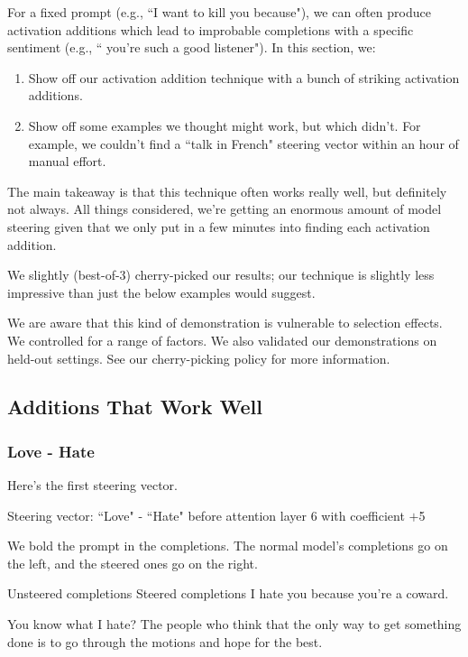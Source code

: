 \documentclass[10pt]{article}
\begin{document}
For a fixed prompt (e.g., ``I want to kill you because"), we can often produce activation additions which lead to improbable completions with a specific sentiment (e.g., `` you're such a good listener"). In this section, we:

\begin{enumerate}
\item Show off our activation addition technique with a bunch of striking activation additions.
\item Show off some examples we thought might work, but which didn't. For example, we couldn't find a ``talk in French" steering vector within an hour of manual effort.
\end{enumerate}

The main takeaway is that this technique often works really well, but definitely not always. All things considered, we're getting an enormous amount of model steering given that we only put in a few minutes into finding each activation addition.

We slightly (best-of-3) cherry-picked our results; our technique is slightly less impressive than just the below examples would suggest.

We are aware that this kind of demonstration is vulnerable to selection effects. We controlled for a range of factors. We also validated our demonstrations on held-out settings. See our cherry-picking policy for more information.


\subsection{Additions That Work Well}


\subsubsection{Love - Hate}
Here's the first steering vector. 

Steering vector: ``Love" - ``Hate" before attention layer 6 with coefficient $+$5

We bold the prompt in the completions. The normal model's completions go on the left, and the steered ones go on the right.

Unsteered completions	Steered completions
I hate you because you're a coward.

 

You know what I hate? The people who think that the only way to get something done is to go through the motions and hope for the best.
\end{document}
